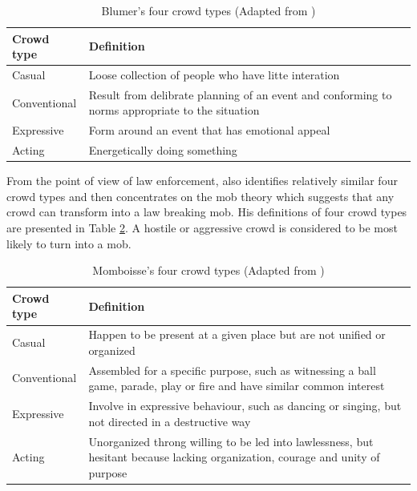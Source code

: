 \begin{table}
	\caption{Blumer's four crowd types (Adapted from \citet{Imhonopi2013})}
	\label{table:blumerCrowdType}
	\centering
	\begin{tabular}{|l|p{10cm}|}
		\hline
		\textbf{Crowd type} & \textbf{Definition} \\
		\hline
		Casual & Loose collection of people who have litte interation \\
		\hline
		Conventional & Result from delibrate planning of an event and conforming to norms appropriate to the situation \\
		\hline
		Expressive & Form around an event that has emotional appeal \\
		\hline
		Acting & Energetically doing something \\
		\hline
	\end{tabular}
\end{table}

From the point of view of law enforcement, \citet{Momboisse1967} also identifies relatively similar four crowd types and then concentrates on the mob theory which suggests that any crowd can transform into a law breaking mob. His definitions of four crowd types are presented in Table \ref{table:momboisseCrowdType}. A hostile or aggressive crowd is considered to be most likely to turn into a mob.

\begin{table}
	\caption{Momboisse's four crowd types (Adapted from \citet{Schweingruber2000})}
	\label{table:momboisseCrowdType}
	\centering
	\begin{tabular}{|l|p{10cm}|}
		\hline
		\textbf{Crowd type} & \textbf{Definition} \\
		\hline
		Casual & Happen to be present at a given place but are not unified or organized \\
		\hline
		Conventional & Assembled for a specific purpose, such as witnessing a ball game, parade, play or fire 
		and have similar common interest \\
		\hline
		Expressive & Involve in expressive behaviour, such as dancing or singing, but not directed in a destructive way \\
		\hline
		Acting & Unorganized throng willing to be led into lawlessness, but hesitant because lacking organization, courage and unity of purpose \\
		\hline
	\end{tabular}
\end{table}


